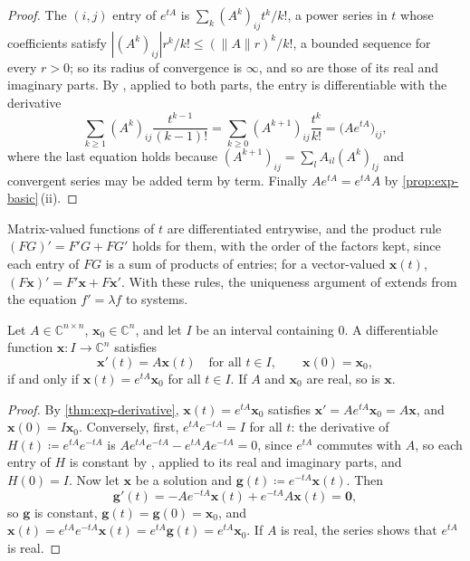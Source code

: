 \begin{proof}
The $(i,j)$ entry of $e^{tA}$ is $\sum_k(A^k)_{ij}t^k/k!$, a power series in $t$ whose coefficients satisfy $|(A^k)_{ij}|r^k/k!\le(\|A\|r)^k/k!$, a bounded sequence for every $r>0$; so its radius of convergence is $\infty$, and so are those of its real and imaginary parts. By , applied to both parts, the entry is differentiable with the derivative
\[
\sum_{k\ge1}(A^k)_{ij}\frac{t^{k-1}}{(k-1)!}=\sum_{k\ge0}(A^{k+1})_{ij}\frac{t^k}{k!}=\bigl(Ae^{tA}\bigr)_{ij},
\]
where the last equation holds because $(A^{k+1})_{ij}=\sum_lA_{il}(A^k)_{lj}$ and convergent series may be added term by term. Finally $Ae^{tA}=e^{tA}A$ by \cref{prop:exp-basic}\,(ii).
\end{proof}

Matrix-valued functions of $t$ are differentiated entrywise, and the product rule $(FG)'=F'G+FG'$ holds for them, with the order of the factors kept, since each entry of $FG$ is a sum of products of entries; for a vector-valued $\mathbf x(t)$, $(F\mathbf x)'=F'\mathbf x+F\mathbf x'$. With these rules, the uniqueness argument of  extends from the equation $f'=\lambda f$ to systems.

\begin{theorem}
\label{thm:linear-system}
Let $A\in\mathbb C^{n\times n}$, $\mathbf x_0\in\mathbb C^n$, and let $I$ be an interval containing $0$. A differentiable function $\mathbf x\colon I\to\mathbb C^n$ satisfies
\[
\mathbf x'(t)=A\mathbf x(t)\quad\text{for all }t\in I,\qquad\mathbf x(0)=\mathbf x_0 ,
\]
if and only if $\mathbf x(t)=e^{tA}\mathbf x_0$ for all $t\in I$. If $A$ and $\mathbf x_0$ are real, so is $\mathbf x$.
\end{theorem}

\begin{proof}
By \cref{thm:exp-derivative}, $\mathbf x(t)=e^{tA}\mathbf x_0$ satisfies $\mathbf x'=Ae^{tA}\mathbf x_0=A\mathbf x$, and $\mathbf x(0)=I\mathbf x_0$. Conversely, first, $e^{tA}e^{-tA}=I$ for all $t$: the derivative of $H(t)\coloneqq e^{tA}e^{-tA}$ is $Ae^{tA}e^{-tA}-e^{tA}Ae^{-tA}=0$, since $e^{tA}$ commutes with $A$, so each entry of $H$ is constant by , applied to its real and imaginary parts, and $H(0)=I$. Now let $\mathbf x$ be a solution and $\mathbf g(t)\coloneqq e^{-tA}\mathbf x(t)$. Then
\[
\mathbf g'(t)=-Ae^{-tA}\mathbf x(t)+e^{-tA}A\mathbf x(t)=\mathbf 0 ,
\]
so $\mathbf g$ is constant, $\mathbf g(t)=\mathbf g(0)=\mathbf x_0$, and $\mathbf x(t)=e^{tA}e^{-tA}\mathbf x(t)=e^{tA}\mathbf g(t)=e^{tA}\mathbf x_0$. If $A$ is real, the series shows that $e^{tA}$ is real.
\end{proof}

